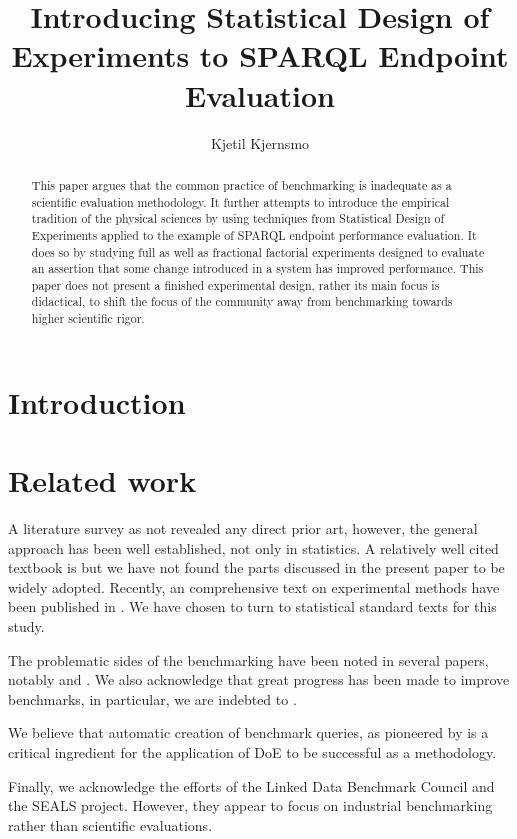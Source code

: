 \documentclass{article}
\title{Introducing Statistical Design of Experiments to SPARQL
  Endpoint Evaluation}
\author{Kjetil Kjernsmo\inst{1}}
\begin{document}
\begin{abstract}
This paper argues that the common practice of benchmarking is
inadequate as a scientific evaluation methodology. It further attempts
to introduce the empirical tradition of the physical sciences by using
techniques from Statistical Design of Experiments applied to the
example of SPARQL endpoint performance evaluation. It does so by
studying full as well as fractional factorial experiments designed to
evaluate an assertion that some change introduced in a system has
improved performance. This paper does not present a finished
experimental design, rather its main focus is didactical, to shift the
focus of the community away from benchmarking towards higher
scientific rigor.
\end{abstract}

\section{Introduction}

\section{Related work}

A literature survey as not revealed any direct prior art, however, the
general approach has been well established, not only in statistics. A
relatively well cited textbook is \cite{citeulike:5190414} but we have
not found the parts discussed in the present paper to be widely
adopted. Recently, an comprehensive text on experimental methods have
been published in
\cite{Springer-2010-Experimental-Methods-for-the-Analysis-of-Optimization-Algorithms}. 
We have chosen to turn to statistical standard texts
\cite{wu2009experiments} for this study.

The problematic sides of the benchmarking have been noted in several
papers, notably \cite{Duan:2011:AOC:1989323.1989340} and
\cite{MontoyaVCRA12}. We also acknowledge that great
progress has been made to improve benchmarks, in particular, we are
indebted to \cite{mxro:Morsey2011DBpedia}. 

We believe that automatic creation of benchmark queries, as
pioneered by \cite{goerlitz2012splodge} is a critical ingredient for
the application of DoE to be successful as a methodology.

Finally, we acknowledge the efforts of the Linked Data Benchmark
Council and the SEALS project. However, they appear to focus on
industrial benchmarking rather than scientific evaluations. 
\end{document}
